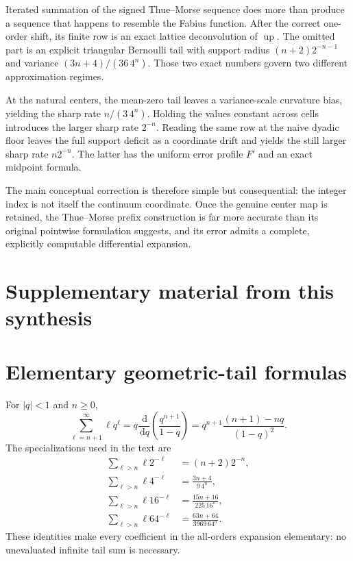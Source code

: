 \documentclass[11pt,oneside]{article}
\theoremstyle{definition}
\theoremstyle{remark}
\newcommand{\Up}{\operatorname{up}}
\newcommand{\dd}{\,\mathrm d}
\begin{document}
Iterated summation of the signed Thue--Morse sequence does more than produce a sequence that
happens to resemble the Fabius function.  After the correct one-order shift, its finite row is
an exact lattice deconvolution of $\Up$.  The omitted part is an explicit triangular Bernoulli
tail with support radius $(n+2)2^{-n-1}$ and variance $(3n+4)/(36\,4^n)$.  Those two exact
numbers govern two different approximation regimes.

At the natural centers, the mean-zero tail leaves a variance-scale curvature bias, yielding
the sharp rate $n/(3\,4^n)$.  Holding the values constant across cells introduces the larger
sharp rate $2^{-n}$.  Reading the same row at the naive dyadic floor leaves the full support
deficit as a coordinate drift and yields the still larger sharp rate $n2^{-n}$.  The latter
has the uniform error profile $F'$ and an exact midpoint formula.

The main conceptual correction is therefore simple but consequential: the integer index is
not itself the continuum coordinate.  Once the genuine center map is retained, the
Thue--Morse prefix construction is far more accurate than its original pointwise formulation
suggests, and its error admits a complete, explicitly computable differential expansion.

\clearpage
\section*{Supplementary material from this synthesis}
\section{Elementary geometric-tail formulas}
\label{tmrates:app:tails}

For $|q|<1$ and $n\ge0$,
\begin{equation}
 \sum_{\ell=n+1}^{\infty}\ell q^\ell
 =q\frac{\dd}{\dd q}\left(\frac{q^{n+1}}{1-q}\right)
 =q^{n+1}\frac{(n+1)-nq}{(1-q)^2}.                        \label{tmrates:eq:geometric-tail}
\end{equation}
The specializations used in the text are
\begin{align}
 \sum_{\ell>n}\ell2^{-\ell}&=(n+2)2^{-n},\\
 \sum_{\ell>n}\ell4^{-\ell}&=\frac{3n+4}{9\,4^n},\\
 \sum_{\ell>n}\ell16^{-\ell}&=\frac{15n+16}{225\,16^n},\\
 \sum_{\ell>n}\ell64^{-\ell}&=\frac{63n+64}{3969\,64^n}.
\end{align}
These identities make every coefficient in the all-orders expansion elementary: no
unevaluated infinite tail sum is necessary.
\end{document}
